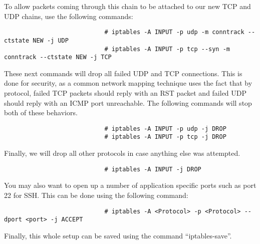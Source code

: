 						To allow packets coming through this chain to be attached to our new TCP and UDP chains, use the following commands:
						\begin{verbatim}
							# iptables -A INPUT -p udp -m conntrack --ctstate NEW -j UDP
							# iptables -A INPUT -p tcp --syn -m conntrack --ctstate NEW -j TCP
						\end{verbatim}
						These next commands will drop all failed UDP and TCP connections.
						This is done for security, as a common network mapping technique uses the fact that by protocol, failed TCP packets should reply with an RST packet and failed UDP should reply with an ICMP port unreachable.
						The following commands will stop both of these behaviors.
						\begin{verbatim}
							# iptables -A INPUT -p udp -j DROP
							# iptables -A INPUT -p tcp -j DROP
						\end{verbatim}
						Finally, we will drop all other protocols in case anything else was attempted.
						\begin{verbatim}
							# iptables -A INPUT -j DROP
						\end{verbatim}
						You may also want to open up a number of application specific ports such as port 22 for SSH.
						This can be done using the following command:
						\begin{verbatim}
							# iptables -A <Protocol> -p <Protocol> --dport <port> -j ACCEPT
						\end{verbatim}
						Finally, this whole setup can be saved using the command ``iptables-save''.


